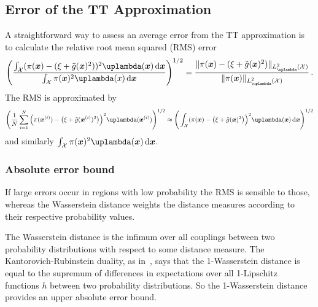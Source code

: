 \subsection{Error of the TT Approximation}
A straightforward way to assess an average error from the TT approximation is to calculate the relative root mean squared (RMS) error 
\begin{align}
	\Bigg( \frac{ \int_{\mathcal{X}} (\pi(\bm{x}) - (\xi + \tilde{g}(\bm{x})^2))^2 \uplambda(\bm{x}) \diff \bm{x}}{ \int_{\mathcal{X}} \pi(\bm{x})^2 \uplambda(x)  \diff \bm{x} } \Bigg)^{1/2} =	\frac{\lVert 	\pi(\bm{x}) - (\xi + \tilde{g}(\bm{x})^2)  \rVert_{L^2_{\uplambda}(\mathcal{X})}}{\lVert 	\pi(\bm{x}) \rVert_{L^2_{\uplambda}(\mathcal{X})}  } \, .
\end{align}
The RMS is approximated by
\begin{align}
	\Bigg( \frac{1}{N} \sum^{N}_{i =1} \Big(\pi(\bm{x}^{(i)}) - \big(\xi + \tilde{g}(\bm{x}^{(i)})^2\big)\Big)^2 \uplambda(\bm{x}^{(i)})\Bigg)^{1/2}    \approx \Bigg(  \int_{\mathcal{X}} (\pi(\bm{x}) - \big(\xi + \tilde{g}(\bm{x})^2\big)\Big)^2 \uplambda(\bm{x}) \diff \bm{x} \Bigg)^{1/2} \label{eq:RMSTT}
\end{align}
and similarly $\int_{\mathcal{X}} \pi(\bm{x})^2 \uplambda(\bm{x})  \diff \bm{x}$.


\subsubsection{Absolute error bound}
\label{subsec:wasser}
If large errors occur in regions with low probability the RMS is sensible to those, whereas the Wasserstein distance weights the distance measures according to their respective probability values.

The Wasserstein distance is the infimum over all couplings between two probability distributions with respect to some distance measure.
The Kantorovich-Rubinstein duality, as in~\cite{thickstun2019kantorovich, Ambrosio2024Kanta}, says that the 1-Wasserstein distance is equal to the supremum of differences in expectations over all 1-Lipschitz functions $h$ between two probability distributions.
So the 1-Wasserstein distance provides an upper absolute error bound.

